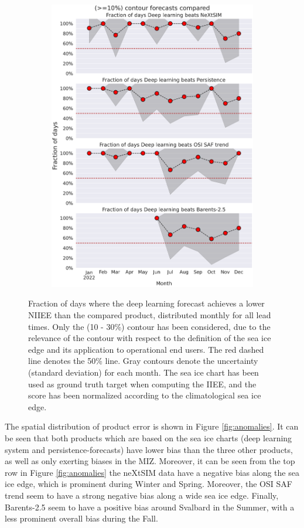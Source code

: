\documentclass[../main/thesis.tex]{subfiles}
\begin{document}
\begin{figure}
\begin{subfigure}{0.32\textwidth}
        \includegraphics[width=\textwidth]{days_beat_weights_09031047.pdf}
    \end{subfigure}
    \caption{\label{fig:days-beat}Fraction of days where the deep learning forecast achieves a lower NIIEE than the compared product, distributed monthly for all lead times. Only the (10 - 30\%) contour has been considered, due to the relevance of the contour with respect to the definition of the sea ice edge and its application to operational end users. The red dashed line denotes the 50\% line. Gray contours denote the uncertainty (standard deviation) for each month. The sea ice chart has been used as ground truth target when computing the IIEE, and the score has been normalized according to the climatological sea ice edge.}
\end{figure}

The spatial distribution of product error is shown in Figure \ref{fig:anomalies}. It can be seen that both products which are based on the sea ice charts (deep learning system and persistence-forecasts) have lower bias than the three other products, as well as only exerting biases in the MIZ. Moreover, it can be seen from the top row in Figure \ref{fig:anomalies} the neXtSIM data have a negative bias along the sea ice edge, which is prominent during Winter and Spring. Moreover, the OSI SAF trend seem to have a strong negative bias along a wide sea ice edge. Finally, Barents-2.5 seem to have a positive bias around Svalbard in the Summer, with a less prominent overall bias during the Fall.
\end{document}
